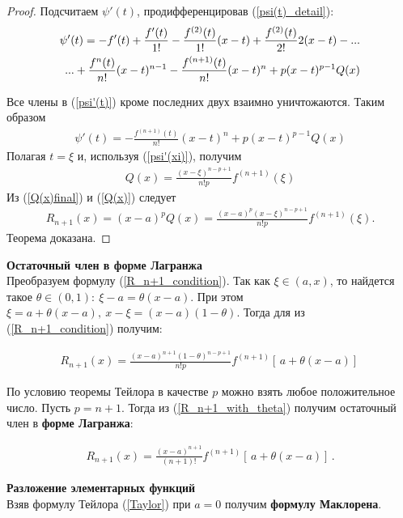 \begin{proof}
    Подсчитаем $\psi'(t)$, продифференцировав (\ref{psi(t)_detail}):
    \begin{align}\label{psi'(t)}
        \psi'(t) = -f'(t) + \frac{f'(t)}{1!} - \frac{f^{(2)}(t)}{1!}(x-t) + \frac{f^{(2)}(t)}{2!}2(x-t) - ... \notag \\
        ... + \frac{f^n(t)}{n!}(x-t)^{n-1} - \frac{f^{(n+1)}(t)}{n!}(x-t)^n + p(x-t)^{p-1}Q(x)
      \end{align}
      
    Все члены в (\ref{psi'(t)}) кроме последних двух взаимно уничтожаются. Таким образом
    \begin{align}
        \psi'(t) = - \frac{f^{(n+1)}(t)}{n!}(x-t)^n + p(x-t)^{p-1}Q(x)
    \end{align}
    Полагая $t = \xi$ и, используя (\ref{psi'(xi)}), получим
    \begin{align}\label{Q(x)final}
        Q(x) = \frac{(x-\xi)^{n-p+1}}{n!p}f^{(n+1)}(\xi)
    \end{align}
    Из (\ref{Q(x)final}) и (\ref{Q(x)}) следует
    \begin{align*}
        R_{n+1}(x) = (x-a)^pQ(x) = \frac{(x-a)^p(x-\xi)^{n-p+1}}{n!p}f^{(n+1)}(\xi).
    \end{align*}
    Теорема доказана.
\end{proof}

\textbf{Остаточный член в форме Лагранжа} \\
Преобразуем формулу (\ref{R_n+1_condition}). Так как $\xi \in (a,x)$, то найдется такое $\theta \in (0,1): \ \xi -a = \theta(x-a)$. При этом $\xi = a + \theta(x-a), \ x-\xi = (x-a)(1-\theta)$. Тогда для из (\ref{R_n+1_condition}) получим:

\begin{align}\label{R_n+1_with_theta}
    R_{n+1}(x) = \frac{(x-a)^{n+1}(1-\theta)^{n-p+1}}{n!p} f^{(n+1)}[\,a + \theta(x-a)]\,
\end{align}

По условию теоремы Тейлора в качестве $p$ можно взять любое положительное число. Пусть $p = n + 1$.
Тогда из (\ref{R_n+1_with_theta}) получим остаточный член в \textbf{форме Лагранжа}:

\begin{align}
    R_{n+1}(x) = \frac{(x-a)^{n+1}}{(n+1)!}f^{(n+1)}[\,a + \theta(x-a)]\,.
\end{align}


\textbf{Разложение элементарных функций}\\
Взяв формулу Тейлора (\ref{Taylor}) при $a=0$ получим \textbf{формулу Маклорена}.

